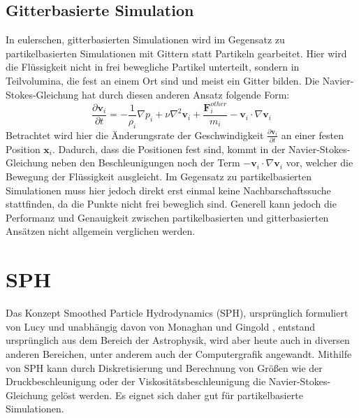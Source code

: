 \documentclass[11pt,
a4paper,
parskip=half, %
BCOR=10mm, %
english,
ngerman]{scrreprt}
\begin{document}
\subsection{Gitterbasierte Simulation}
In eulerschen, gitterbasierten Simulationen wird im Gegensatz zu partikelbasierten Simulationen mit Gittern statt Partikeln gearbeitet.
Hier wird die Flüssigkeit nicht in frei bewegliche Partikel unterteilt, sondern in Teilvolumina, die fest an einem Ort sind und meist ein Gitter bilden.
Die Navier-Stokes-Gleichung hat durch diesen anderen Ansatz folgende Form:
\begin{equation}
    \frac{\partial\textbf{v}_i}{\partial t} = -\frac{1}{\rho_i} \nabla p_i + \nu \nabla^2 \textbf{v}_i + \frac{\textbf{F}_i^{other}}{m_i} - \textbf{v}_i \cdot \nabla \textbf{v}_i
\end{equation}
Betrachtet wird hier die Änderungsrate der Geschwindigkeit $\frac{\partial\textbf{v}_i}{\partial t}$ an einer festen Position $\textbf{x}_i$.
Dadurch, dass die Positionen fest sind,
kommt in der Navier-Stokes-Gleichung neben den Beschleunigungen noch der Term $- \textbf{v}_i \cdot \nabla \textbf{v}_i$ vor,
welcher die Bewegung der Flüssigkeit ausgleicht.
Im Gegensatz zu partikelbasierten Simulationen muss hier jedoch direkt erst einmal keine Nachbarschaftssuche stattfinden,
da die Punkte nicht frei beweglich sind.
Generell kann jedoch die Performanz und Genauigkeit zwischen partikelbasierten und gitterbasierten Ansätzen nicht allgemein verglichen werden.


\section{SPH}
Das Konzept Smoothed Particle Hydrodynamics (SPH),
ursprünglich formuliert von Lucy \cite{lucy_numerical_1977} und unabhängig davon von Monaghan und Gingold \cite{gingold_smoothed_1977},
entstand ursprünglich aus dem Bereich der Astrophysik, wird aber heute auch in diversen anderen Bereichen,
unter anderem auch der Computergrafik angewandt.
Mithilfe von SPH kann durch Diskretisierung und Berechnung von Größen wie der Druckbeschleunigung oder der Viskositätsbeschleunigung
die Navier-Stokes-Gleichung gelöst werden.
Es eignet sich daher gut für partikelbasierte Simulationen.
\end{document}
